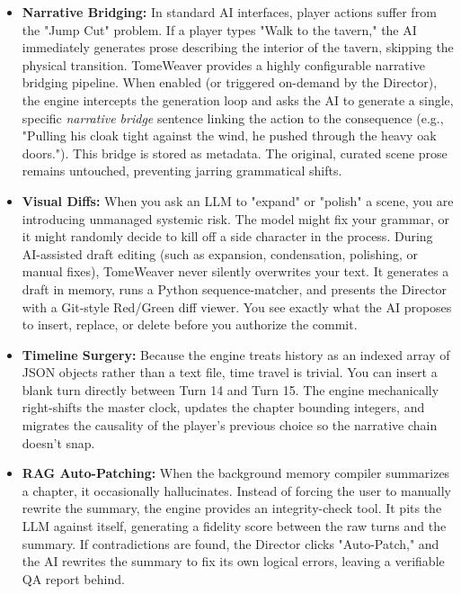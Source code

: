 \documentclass[12pt, a4paper]{article}
\begin{document}
\begin{itemize}
    \item \textbf{Narrative Bridging:} In standard AI interfaces, player actions suffer from the "Jump Cut" problem. If a player types "Walk to the tavern," the AI immediately generates prose describing the interior of the tavern, skipping the physical transition. TomeWeaver provides a highly configurable narrative bridging pipeline. When enabled (or triggered on-demand by the Director), the engine intercepts the generation loop and asks the AI to generate a single, specific \textit{narrative bridge} sentence linking the action to the consequence (e.g., "Pulling his cloak tight against the wind, he pushed through the heavy oak doors."). This bridge is stored as metadata. The original, curated scene prose remains untouched, preventing jarring grammatical shifts.
    \item \textbf{Visual Diffs:} When you ask an LLM to "expand" or "polish" a scene, you are introducing unmanaged systemic risk. The model might fix your grammar, or it might randomly decide to kill off a side character in the process. During AI-assisted draft editing (such as expansion, condensation, polishing, or manual fixes), TomeWeaver never silently overwrites your text. It generates a draft in memory, runs a Python sequence-matcher, and presents the Director with a Git-style Red/Green diff viewer. You see exactly what the AI proposes to insert, replace, or delete before you authorize the commit.
    \item \textbf{Timeline Surgery:} Because the engine treats history as an indexed array of JSON objects rather than a text file, time travel is trivial. You can insert a blank turn directly between Turn 14 and Turn 15. The engine mechanically right-shifts the master clock, updates the chapter bounding integers, and migrates the causality of the player's previous choice so the narrative chain doesn't snap.
    \item \textbf{RAG Auto-Patching:} When the background memory compiler summarizes a chapter, it occasionally hallucinates. Instead of forcing the user to manually rewrite the summary, the engine provides an integrity-check tool. It pits the LLM against itself, generating a fidelity score between the raw turns and the summary. If contradictions are found, the Director clicks "Auto-Patch," and the AI rewrites the summary to fix its own logical errors, leaving a verifiable QA report behind.
    
\end{itemize}
\end{document}
